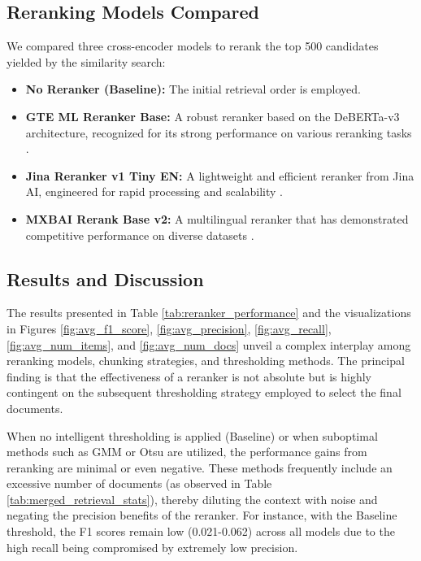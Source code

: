 \subsection{Reranking Models Compared}
We compared three cross-encoder models to rerank the top 500 candidates yielded by the similarity search:
\begin{itemize}
    \item \textbf{No Reranker (Baseline):} The initial retrieval order is employed.
    \item \textbf{GTE ML Reranker Base:} A robust reranker based on the DeBERTa-v3 architecture, recognized for its strong performance on various reranking tasks \autocite{zhang2024mgte}.
    \item \textbf{Jina Reranker v1 Tiny EN:} A lightweight and efficient reranker from Jina AI, engineered for rapid processing and scalability \autocite{jina-reranker-v1-tiny-en}.
    \item \textbf{MXBAI Rerank Base v2:} A multilingual reranker that has demonstrated competitive performance on diverse datasets \autocite{v2rerank2025mxbai}.
\end{itemize}

\subsection{Results and Discussion}

The results presented in Table \ref{tab:reranker_performance} and the visualizations in Figures \ref{fig:avg_f1_score}, \ref{fig:avg_precision}, \ref{fig:avg_recall}, \ref{fig:avg_num_items}, and \ref{fig:avg_num_docs} unveil a complex interplay among reranking models, chunking strategies, and thresholding methods. The principal finding is that the effectiveness of a reranker is not absolute but is highly contingent on the subsequent thresholding strategy employed to select the final documents.

When no intelligent thresholding is applied (Baseline) or when suboptimal methods such as GMM or Otsu are utilized, the performance gains from reranking are minimal or even negative. These methods frequently include an excessive number of documents (as observed in Table \ref{tab:merged_retrieval_stats}), thereby diluting the context with noise and negating the precision benefits of the reranker. For instance, with the Baseline threshold, the F1 scores remain low (0.021-0.062) across all models due to the high recall being compromised by extremely low precision.

